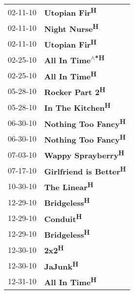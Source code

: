 \begin{supertabular}{p{0.25\columnwidth}p{0.75\columnwidth}}
 02-11-10 &           \textbf{Utopian Fir\textsuperscript{H}} \\
 02-11-10 &           \textbf{Night Nurse\textsuperscript{H}} \\
 02-11-10 &           \textbf{Utopian Fir\textsuperscript{H}} \\
 02-25-10 &  \textbf{All In Time\textsuperscript{$\wedge$*H}} \\
 02-25-10 &           \textbf{All In Time\textsuperscript{H}} \\
 05-28-10 &         \textbf{Rocker Part 2\textsuperscript{H}} \\
 05-28-10 &        \textbf{In The Kitchen\textsuperscript{H}} \\
 06-30-10 &     \textbf{Nothing Too Fancy\textsuperscript{H}} \\
 06-30-10 &     \textbf{Nothing Too Fancy\textsuperscript{H}} \\
 07-03-10 &      \textbf{Wappy Sprayberry\textsuperscript{H}} \\
 07-17-10 &  \textbf{Girlfriend is Better\textsuperscript{H}} \\
 10-30-10 &            \textbf{The Linear\textsuperscript{H}} \\
 12-29-10 &            \textbf{Bridgeless\textsuperscript{H}} \\
 12-29-10 &               \textbf{Conduit\textsuperscript{H}} \\
 12-29-10 &            \textbf{Bridgeless\textsuperscript{H}} \\
 12-30-10 &                   \textbf{2x2\textsuperscript{H}} \\
 12-30-10 &                \textbf{JaJunk\textsuperscript{H}} \\
 12-31-10 &           \textbf{All In Time\textsuperscript{H}} \\
\end{supertabular}
